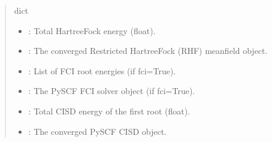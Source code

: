 \documentclass[letterpaper,10pt,english]{sphinxmanual}
\begin{document}
\begin{fulllineitems}
\begin{quote}
\begin{description}
\sphinxAtStartPar

\sphinxAtStartPar
dict
\begin{itemize}
\item {} 
\sphinxAtStartPar
{}: Total Hartree\sphinxhyphen{}Fock energy (float).

\item {} 
\sphinxAtStartPar
{}: The converged Restricted Hartree\sphinxhyphen{}Fock (RHF) mean\sphinxhyphen{}field object.

\item {} 
\sphinxAtStartPar
{}: List of FCI root energies (if fci=True).

\item {} 
\sphinxAtStartPar
{}: The PySCF FCI solver object (if fci=True).

\item {} 
\sphinxAtStartPar
{}: Total CISD energy of the first root (float).

\item {} 
\sphinxAtStartPar
{}: The converged PySCF CISD object.

\end{itemize}


\end{description}\end{quote}

\begin{sphinxVerbatim}[commandchars=\\\{\}]
  \PYG{p}{[}\PYG{p}{]}
   
\PYG{p}{[}\PYG{p}{]}
\PYG{p}{[}\PYG{p}{]}
\end{sphinxVerbatim}

\end{fulllineitems}
\end{document}
